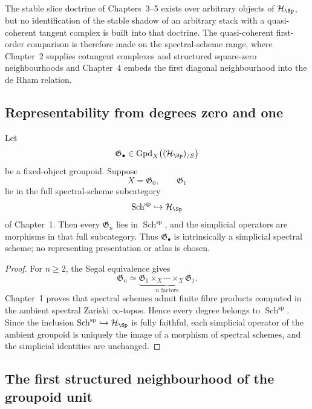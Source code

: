 The stable slice doctrine of Chapters~3--5 exists over arbitrary objects of
$\mathcal H_{\Sp}$, but no identification of the stable shadow of an
arbitrary stack with a quasi-coherent tangent complex is built into that
doctrine.  The quasi-coherent first-order comparison is therefore made on the
spectral-scheme range, where Chapter~2 supplies cotangent
complexes and structured square-zero neighbourhoods and Chapter~4 embeds the
first diagonal neighbourhood into the de Rham relation.

\subsection{Representability from degrees zero and one}

\begin{proposition}
\label{prop:represented-groupoid-segal}
Let
\[
    \mathfrak G_\bullet\in
    \operatorname{Gpd}_X\bigl((\mathcal H_{\Sp})_{/S}\bigr)
\]
be a fixed-object groupoid.  Suppose
\[
    X=\mathfrak G_0,\qquad \mathfrak G_1
\]
lie in the full spectral-scheme subcategory
\[
    \operatorname{Sch}^{\mathrm{sp}}
    \hookrightarrow
    \mathcal H_{\Sp}
\]
of Chapter~1.  Then every $\mathfrak G_n$ lies in
$\operatorname{Sch}^{\mathrm{sp}}$, and the simplicial operators are morphisms in
that full subcategory.  Thus $\mathfrak G_\bullet$ is intrinsically a
simplicial spectral scheme; no representing presentation or atlas is chosen.
\end{proposition}

\begin{proof}
For $n\geq2$, the Segal equivalence gives
\[
    \mathfrak G_n
    \simeq
    \underbrace{
        \mathfrak G_1\times_X\cdots\times_X\mathfrak G_1
    }_{n\text{ factors}}.
\]
Chapter~1 proves that spectral schemes admit finite fibre products computed in
the ambient spectral Zariski $\infty$-topos.  Hence every degree belongs to
$\operatorname{Sch}^{\mathrm{sp}}$.  Since the inclusion
$\operatorname{Sch}^{\mathrm{sp}}\hookrightarrow\mathcal H_{\Sp}$ is fully
faithful, each simplicial operator of the ambient groupoid is uniquely the
image of a morphism of spectral schemes, and the simplicial identities are
unchanged.
\end{proof}

\subsection{The first structured neighbourhood of the groupoid unit}

